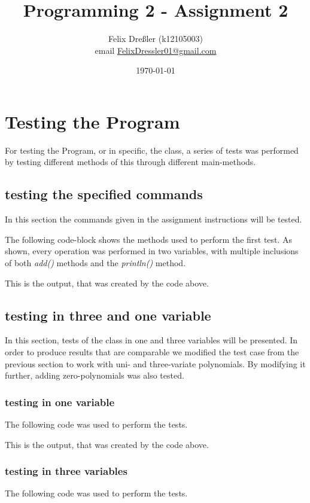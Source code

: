 \documentclass[11pt,titlepage]{article}
\title{Programming 2 - Assignment 2}
\author{Felix Dreßler (k12105003)\\ email \href{mailto:FelixDressler01@gmail.com}{FelixDressler01@gmail.com}}
\date{\today} %
\begin{document}
\maketitle
	\section{Testing the Program}
	For testing the Program, or in specific, the class, a series of tests was performed by testing different methods of this through different main-methods.
	
	\subsection{testing the specified commands}
	In this section the commands given in the assignment instructions will be tested.
	
	The following code-block shows the methods used to perform the first test. As shown, every operation was performed in two variables, with multiple inclusions of both \emph{add()} methods and the \emph{println()} method.
		
		
	This is the output, that was created by the code above.
		
		
\newpage	
	\subsection{testing in three and one variable}
	In this section, tests of the class in one and three variables will be presented. In order to produce results that are comparable we modified the test case from the previous section to work with uni- and three-variate polynomials.
	By modifying it further, adding zero-polynomials was also tested.
	
		\subsubsection{testing in one variable}
		The following code was used to perform the tests.
			
\newpage	
		This is the output, that was created by the code above.
			
		
		\subsubsection{testing in three variables}
		The following code was used to perform the tests.
			
			
\end{document}

